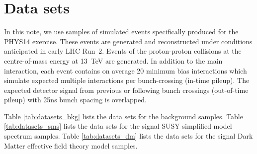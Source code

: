 \section{Data sets}
\label{sec:datasets}

In this note, we use samples of simulated events specifically produced
for the PHYS14 exercise. These events are generated and reconstructed
under conditions anticipated in early LHC Run~2. Events of the
proton-proton collisions at the centre-of-mass energy at 13~TeV are
generated. In addition to the main interaction, each event contains on
average 20 minimum bias interactions which simulate expected multiple
interactions per bunch-crossing (in-time pileup). The expected detector
signal from previous or following bunch crossings (out-of-time pileup)
with 25ns bunch spacing is overlapped.

Table \ref{tab:datasets_bkg} lists the data sets for the background
samples. Table \ref{tab:datasets_sms} lists the data sets for the signal
SUSY simplified model spectrum samples. Table \ref{tab:datasets_dm}
lists the data sets for the signal
Dark Matter effective field theory model samples.


\begin{landscape}
\begin{table}[!h]
\scriptsize 
\label{tab:datasets_bkg}
\end{table}
\end{landscape}

\begin{landscape}
\begin{table}[!h]
\scriptsize 
\label{tab:datasets_sms}
\end{table}

\begin{table}[!h]
\scriptsize 
\label{tab:datasets_dm}
\end{table}
\end{landscape}



